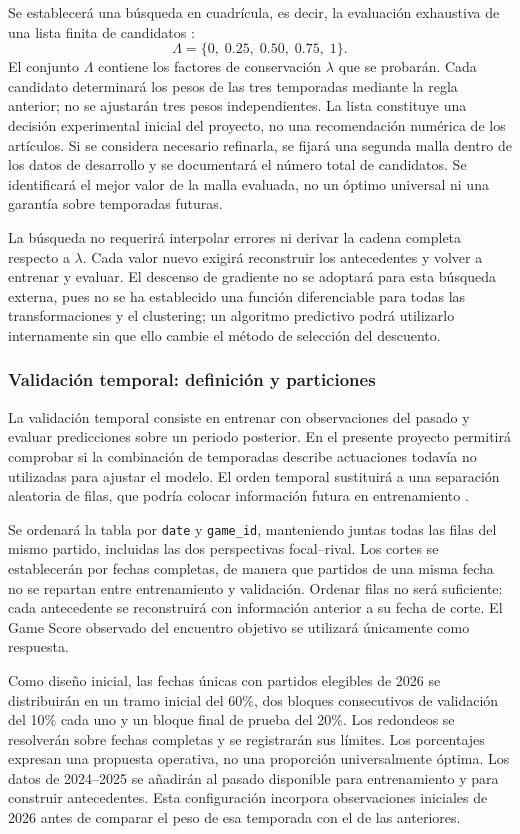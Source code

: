 Se establecerá una búsqueda en cuadrícula, es decir, la evaluación exhaustiva de una lista finita de candidatos \cite{sklearnSearch613}:
\[
 \Lambda=\{0,\;0.25,\;0.50,\;0.75,\;1\}.
\]
El conjunto $\Lambda$ contiene los factores de conservación $\lambda$ que se probarán. Cada candidato determinará los pesos de las tres temporadas mediante la regla anterior; no se ajustarán tres pesos independientes. La lista constituye una decisión experimental inicial del proyecto, no una recomendación numérica de los artículos. Si se considera necesario refinarla, se fijará una segunda malla dentro de los datos de desarrollo y se documentará el número total de candidatos. Se identificará el mejor valor de la malla evaluada, no un óptimo universal ni una garantía sobre temporadas futuras.

La búsqueda no requerirá interpolar errores ni derivar la cadena completa respecto a $\lambda$. Cada valor nuevo exigirá reconstruir los antecedentes y volver a entrenar y evaluar. El descenso de gradiente no se adoptará para esta búsqueda externa, pues no se ha establecido una función diferenciable para todas las transformaciones y el clustering; un algoritmo predictivo podrá utilizarlo internamente sin que ello cambie el método de selección del descuento.

\subsubsection*{Validación temporal: definición y particiones}
La validación temporal consiste en entrenar con observaciones del pasado y evaluar predicciones sobre un periodo posterior. En el presente proyecto permitirá comprobar si la combinación de temporadas describe actuaciones todavía no utilizadas para ajustar el modelo. El orden temporal sustituirá a una separación aleatoria de filas, que podría colocar información futura en entrenamiento \cite{sklearnTemporal613}.

Se ordenará la tabla por \texttt{date} y \texttt{game\_id}, manteniendo juntas todas las filas del mismo partido, incluidas las dos perspectivas focal--rival. Los cortes se establecerán por fechas completas, de manera que partidos de una misma fecha no se repartan entre entrenamiento y validación. Ordenar filas no será suficiente: cada antecedente se reconstruirá con información anterior a su fecha de corte. El Game Score observado del encuentro objetivo se utilizará únicamente como respuesta.

Como diseño inicial, las fechas únicas con partidos elegibles de 2026 se distribuirán en un tramo inicial del 60\%, dos bloques consecutivos de validación del 10\% cada uno y un bloque final de prueba del 20\%. Los redondeos se resolverán sobre fechas completas y se registrarán sus límites. Los porcentajes expresan una propuesta operativa, no una proporción universalmente óptima. Los datos de 2024--2025 se añadirán al pasado disponible para entrenamiento y para construir antecedentes. Esta configuración incorpora observaciones iniciales de 2026 antes de comparar el peso de esa temporada con el de las anteriores.


